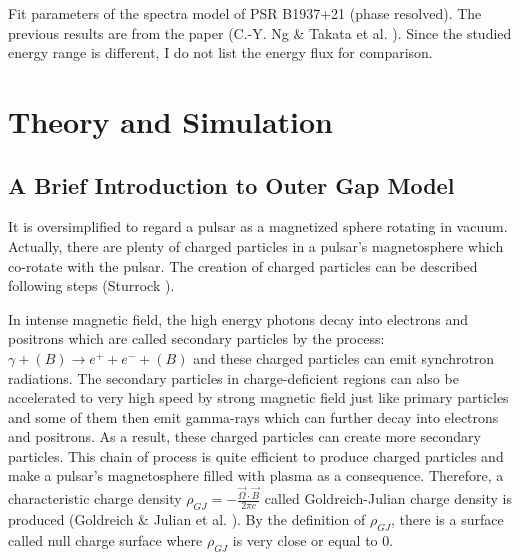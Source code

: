 \documentclass[12pt]{report}
\newcommand{\mycaption}[1]{\protect \caption{#1}}
\begin{document}
        \begin{table}[!htp]
          \centering
            \mycaption{Fit parameters of the spectra model of PSR B1937+21 (phase resolved). 
              The previous results are from the paper (C.-Y. Ng \& Takata et al. 
              \cite{0004-637X-787-2-167}).
              Since the studied energy range is different, I do not list the energy flux for 
              comparison.}
            \label{table: j1939_fit_result}        
        \end{table} 

\chapter{Theory and Simulation}
  \section{A Brief Introduction to Outer Gap Model}
    It is oversimplified to regard a pulsar as a magnetized sphere rotating in vacuum. 
    Actually, there are plenty of charged particles in a pulsar's magnetosphere 
    which co-rotate with the pulsar. The creation of charged particles can 
    be described following steps (Sturrock \cite{Sturrock:1971zc}).

    In intense magnetic field, the high energy photons decay into electrons and 
    positrons which are called secondary particles by the process: 
    $\gamma + (B) \rightarrow e^++e^-+(B)$ and these charged particles can emit 
    synchrotron radiations. The secondary particles in charge-deficient regions can also 
    be accelerated to very high speed by strong magnetic field just like primary particles 
    and some of them then emit gamma-rays which can further decay into electrons and 
    positrons. As a result, these charged particles can create more secondary particles.
    This chain of process is quite efficient to produce charged particles and 
    make a pulsar's magnetosphere filled with plasma as a consequence. Therefore, a 
    characteristic charge density $\rho_{GJ}=-\frac{\vec{\Omega}\cdot \vec{B}}{2\pi c}$ 
    called Goldreich-Julian charge density is produced (Goldreich \& Julian et al. \cite{1969ApJ}). 
    By the definition of $\rho_{GJ}$, there is a surface called null charge surface where 
    $\rho_{GJ}$ is very close or equal to $0$. 
\end{document}
